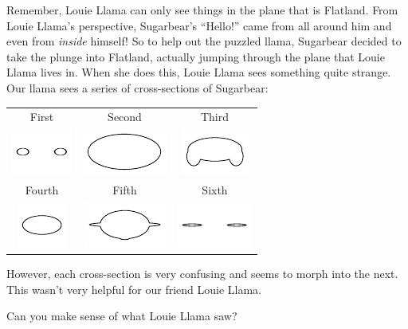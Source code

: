 Remember, Louie Llama can only see things in the plane that is
Flatland. From Louie Llama's perspective, Sugarbear's ``Hello!''  came
from all around him and even from \textit{inside} himself!  So to help
out the puzzled llama, Sugarbear decided to take the plunge into
Flatland, actually jumping through the plane that Louie Llama lives
in. When she does this, Louie Llama sees something quite strange. Our
llama sees a series of cross-sections of Sugarbear:
\begin{center}
\begin{tabular}{|c|c|c|}
\hline
First & Second & Third\\
\includegraphics{../graphics/sugarbearCrossSections1.pdf} 
& \includegraphics{../graphics/sugarbearCrossSections2.pdf} 
& \includegraphics{../graphics/sugarbearCrossSections3.pdf} 
\\
\hline 
Fourth & Fifth & Sixth\\
\includegraphics{../graphics/sugarbearCrossSections4.pdf} 
& \includegraphics{../graphics/sugarbearCrossSections5.pdf} 
& \includegraphics{../graphics/sugarbearCrossSections6.pdf} 
\\
\hline
\end{tabular}
\end{center}

However, each cross-section is very confusing and seems to morph into
the next. This wasn't very helpful for our friend Louie Llama.
\begin{ques}
Can you make sense of what Louie Llama saw?
\end{ques}
\QM 

